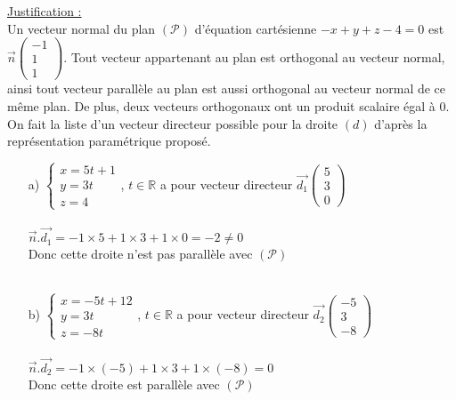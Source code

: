 \documentclass[a4paper, 12pt]{article}
\begin{document}
\noindent
\underline{Justification :}
\\
Un vecteur normal du plan $(\mathcal{P})$ d'équation cartésienne $ - x + y + z - 4 = 0$ est $\vec{n}\begin{pmatrix}-1 \\ 1 \\ 1\end{pmatrix}$.
Tout vecteur appartenant au plan est orthogonal au vecteur normal, ainsi tout vecteur parallèle au plan est aussi orthogonal au vecteur normal de ce même plan.
De plus, deux vecteurs orthogonaux ont un produit scalaire égal à 0.
\\
On fait la liste d'un vecteur directeur possible pour la droite $(d)$ d'après la représentation paramétrique proposé. 
\begin{itemize}
    \item[a)] $\begin{cases} x = 5t + 1 \\ y = 3t \\ z = 4 \end{cases}$, $t \in \mathds{R}$ a pour vecteur directeur $\vec{d_1}\begin{pmatrix} 5 \\ 3 \\ 0 \end{pmatrix}$ \\ \\ 
        $\vec{n}.\vec{d_1} = -1 \times 5 + 1 \times 3 + 1 \times 0 = -2 \neq 0$ \\ 
        Donc cette droite n'est pas parallèle avec $(\mathcal{P})$ \\ \\

    \item[b)] $\begin{cases} x = -5t +12 \\ y = 3t \\ z = -8t \end{cases}$, $t \in \mathds{R}$ a pour vecteur directeur $\vec{d_2}\begin{pmatrix} -5 \\ 3 \\ -8 \end{pmatrix}$ \\ \\ 
        $\vec{n}.\vec{d_2} = -1 \times (-5) + 1 \times 3 + 1 \times (-8) = 0$ \\ 
        Donc cette droite est parallèle avec $(\mathcal{P})$ \\ \\


\end{itemize}
\end{document}
